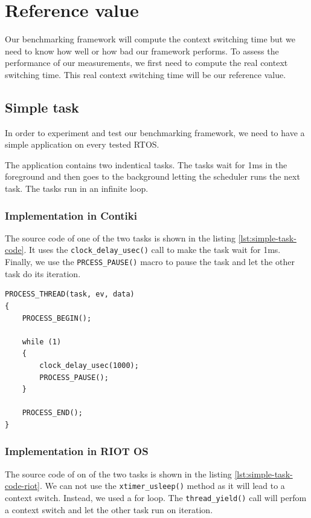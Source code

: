 \section{Reference value}

Our benchmarking framework will compute the context switching time but we need to know how well or how bad our framework performs.
To assess the performance of our measurements, we first need to compute the real context switching time.
This real context switching time will be our reference value.

\subsection{Simple task}
In order to experiment and test our benchmarking framework, we need to have a simple application on every tested RTOS.

The application contains two indentical tasks.
The tasks wait for 1ms in the foreground and then goes to the background letting the scheduler runs the next task.
The tasks run in an infinite loop.

\subsubsection{Implementation in Contiki}
The source code of one of the two tasks is shown in the listing \ref{lst:simple-task-code}.
It uses the \texttt{clock\_delay\_usec()} call to make the task wait for 1ms.
Finally, we use the \texttt{PRCESS\_PAUSE()} macro to pause the task and let the other task do its iteration.

\begin{lstlisting}[style=CStyle, float, label={lst:simple-task-code}, caption={Source code of a task implemented in Contiki for the simple application}]
PROCESS_THREAD(task, ev, data)
{
    PROCESS_BEGIN();

    while (1)
    {
        clock_delay_usec(1000);
        PROCESS_PAUSE();
    }

    PROCESS_END();
}
\end{lstlisting}

\subsubsection{Implementation in RIOT OS}
The source code of on of the two tasks is shown in the listing \ref{lst:simple-task-code-riot}.
We can not use the \texttt{xtimer\_usleep()} method as it will lead to a context switch.
Instead, we used a for loop.
The \texttt{thread\_yield()} call will perfom a context switch and let the other task run on iteration.

